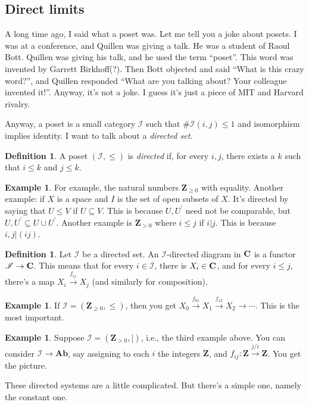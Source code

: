 \documentclass{amsart}
\theoremstyle{theorem}
\theoremstyle{definition}
\newtheorem{definition}[theorem]{Definition}
\newtheorem{example}[theorem]{Example}
\def\cI{\mathscr I}\def\cJ{\mathscr J}\def\cK{\mathscr K}\def\cL{\mathscr L}
\newcommand{\Z}{\mathbf Z}
\begin{document}
\subsection{Direct limits}
A long time ago, I said what a poset was. Let me tell you a joke about posets. I was at a conference, and Quillen was giving a talk. He was a student of Raoul Bott. Quillen was giving his talk, and he used the term ``poset''. This word was invented by Garrett Birkhoff(?). Then Bott objected and said ``What is this crazy word?'', and Quillen responded ``What are you talking about? Your colleague invented it!''. Anyway, it's not a joke. I guess it's just a piece of MIT and Harvard rivalry.

Anyway, a poset is a small category $\cI$ such that $\#\cI(i,j)\leq 1$ and isomorphism implies identity. I want to talk about a \emph{directed set}.
\begin{definition}
A poset $(\cI,\leq)$ is \emph{directed} if, for every $i,j$, there exists a $k$ such that $i\leq k$ and $j\leq k$.
\end{definition}
\begin{example}
For example, the natural numbers $\Z_{\geq 0}$ with equality. Another example: if $X$ is a space and $I$ is the set of open subsets of $X$. It's directed by saying that $U\leq V$ if $U\subseteq V$. This is because $U,U^\prime$ need not be comparable, but $U,U^\prime\subseteq U\cup U^\prime$. Another example is $\Z_{>0}$ where $i\leq j$ if $i|j$. This is because $i,j|(ij)$.
\end{example}
\begin{definition}
Let $\cI$ be a directed set. An $\cI$-directed diagram in $\mathbf C$ is a functor $\cI\to\cc$. This means that for every $i\in \cI$, there is $X_i\in\mathbf C$, and for every $i\leq j$, there's a map $X_i\xrightarrow{f_{ij}} X_j$ (and similarly for composition).
\end{definition}
\begin{example}\label{linear}
If $\cI=(\Z_{\geq 0},\leq)$, then you get $X_0\xrightarrow{f_{01}}X_1\xrightarrow{f_{12}}X_2\to\cdots$. This is the most important.
\end{example}
\begin{example}
Suppose $\cI=(\Z_{>0},|)$, i.e., the third example above. You can consider $\cI\to\mathbf{Ab}$, say assigning to each $i$ the integers $\Z$, and $f_{ij}:\Z\xrightarrow{j/i}\Z$. You get the picture.
\end{example}
These directed systems are a little complicated. But there's a simple one, namely the constant one. 
\end{document}
